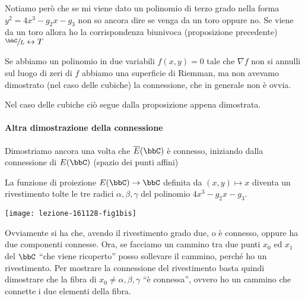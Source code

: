 \begin{osservazione}
  Notiamo però che se mi viene dato un polinomio di terzo grado nella
  forma $y^2 = 4x^3 - g_2 x - g_3$ non so ancora dire se venga da un
  toro oppure no. Se viene da un toro allora ho la corrispondenza
  biunivoca (proposizione precedente) $\sfrac{\bbC}{L} \leftrightarrow T$
\end{osservazione}

\begin{osservazione}
  Se abbiamo un polinomio in due variabili $f(x, y) = 0$ tale che
  $\nabla f$ non si annulli sul luogo di zeri di $f$ abbiamo una
  superficie di Riemman, ma non avevamo dimostrato (nel caso delle
  cubiche) la connessione, che in generale non è ovvia.

  Nel caso delle cubiche ciò segue dalla proposizione appena dimostrata.
\end{osservazione}

\paragraph{Altra dimostrazione della connessione} Dimostriamo ancora una
volta che $\ol{E}(\bbC)$ è connesso, iniziando dalla connessione di
$E(\bbC)$ (spazio dei punti affini)


La funzione di proiezione $E(\bbC) \rar \bbC$ definita da $(x, y) \mapsto x$
diventa un rivestimento tolte le tre radici $\alpha, \beta, \gamma$ del
polinomio $4x^3 - g_2 x - g_3$.


\begin{center}
  \texttt{[image: lezione-161128-fig1bis]}
\end{center}


Ovviamente si ha che, avendo il rivestimento grado due, o è connesso,
oppure ha due componenti connesse. Ora, se facciamo un cammino tra due
punti $x_0$ ed $x_1$ del $\bbC$ ``che viene ricoperto'' posso sollevare
il cammino, perché ho un rivestimento. Per mostrare la connessione del
rivestimento basta quindi dimostrare che la fibra di $x_0 \neq \alpha,
\beta, \gamma$ ``è connessa'', ovvero ho un cammino che connette i due
elementi della fibra.

